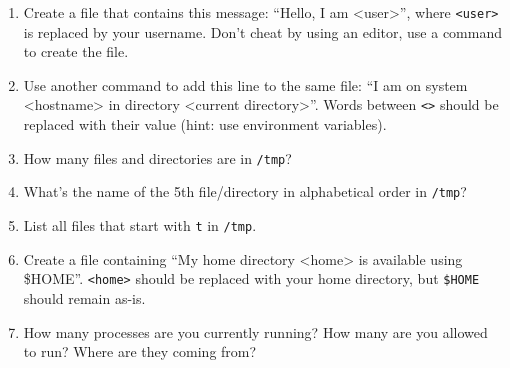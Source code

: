 \begin{enumerate}
    \item Create a file that contains this message: ``Hello, I am <user>'',
        where \lstinline|<user>| is replaced by your username. Don't cheat by using
        an editor, use a command to create the file.
    \item Use another command to add this line to the same file: ``I am on system <hostname> in
        directory <current directory>''. Words between \lstinline|<>| should be replaced with
        their value (hint: use environment variables).
    \item How many files and directories are in \lstinline|/tmp|?
    \item What's the name of the 5th file/directory in alphabetical order in \lstinline|/tmp|?
    \item List all files that start with \lstinline|t| in \lstinline|/tmp|.
    \item Create a file containing ``My home directory <home> is available using \$HOME''.
        \lstinline|<home>| should be replaced with your home directory, but \lstinline|$HOME|
        should remain as-is.
    \item How many processes are you currently running? How many are you allowed
        to run? Where are they coming from?
\end{enumerate}
